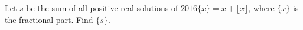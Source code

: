 Let $ s $ be the sum of all positive real solutions of $ 2016\{x\}=x+\lfloor x\rfloor $, where $\{x\}$ is the fractional part. Find $\{s\}$.
